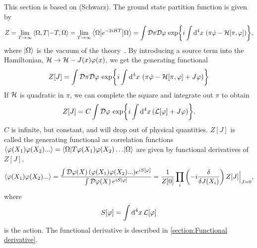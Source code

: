 \label{Effective potential}
This section is based on \cite{Peskin:IntroQFT,weinberg_1995,weinberg_1996_vol2} (Schwarz).
The ground state partition function is given by
\begin{equation}
    Z = \lim_{T\rightarrow \infty} \braket{\Omega, T}{-T, \Omega}
    = \lim_{T\rightarrow \infty} \left\langle \Omega {\left|  e^{-2iHT}  \right|} \Omega \right\rangle
    = \int \mathcal{D} \pi \mathcal{D} \varphi \, \exp{ i \int \dd^4 x \, \left(\pi \dot \varphi - \mathcal{H}[\pi, \varphi]\right) },
\end{equation}
where $\ket{\Omega}$ is the vacuum of the theory~\cite{Peskin:IntroQFT,weinberg_1995}.
By introducing a source term into the Hamiltonian, $\mathcal{H} \rightarrow \mathcal{H} - J(x)\varphi(x)$, we get the generating functional
\begin{equation}
    Z[J] = 
    \int \mathcal{D} \pi \mathcal{D} \varphi \, 
    \exp{ i \int \dd^4 x \, \left(\pi \dot \varphi - \mathcal{H}[\pi, \varphi]+ J\varphi\right) }
\end{equation}
If $\mathcal{H}$ is quadratic in $\pi$, we can complete the square and integrate out $\pi$ to obtain
\begin{equation}
    Z[J] = C \int \mathcal{D} \varphi \, \exp{i \int \dd^4 x\, (\mathcal{L}[\varphi] + J \varphi)}.
\end{equation}
$C$ is infinite, but constant, and will drop out of physical quantities.
$Z[J]$ is called the generating functional as correlation functions $\ex{\varphi(X_1)\varphi(X_2)...} = \inner{\Omega}{T{\varphi(X_1)\varphi(X_2)\dots}}{\Omega}$ are given by functional derivatives of $Z[J]$, 
\begin{equation}
    \label{correlator from generating functional}
    \ex{\varphi(X_1)\varphi(X_2)...}
    = 
    \frac{\int \D \varphi(X)\,  (\varphi(X_1)\varphi(X_2)...) e^{i S[\varphi]}}
        {\int \D \varphi(X)\, e^{i S[\varphi]}}
    =
    \frac{1}{Z[0]} \prod_i\left( -i  \fdv{J(X_i)}\right) Z[J]\Big|_{J = 0},
\end{equation}
where 
\begin{equation}
    S[\varphi] = \int \dd^4 x \, \mathcal{L}[\varphi]
\end{equation}
is the action.
The functional derivative is described in \autoref{section:Functional derivative}.


